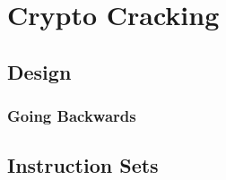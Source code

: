 \providecommand{\heading}[1]{\section{#1}}
\providecommand{\subheading}[1]{\subsection{#1}}

\heading{Crypto Cracking}\label{subsec:CTFs-cc}

    \subheading{Design}
        \subsubsection*{Going Backwards}

    \subheading{Instruction Sets}\label{subsubsec:CTFs-cc-instructions}

